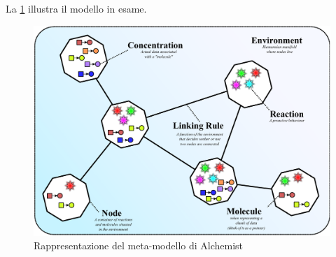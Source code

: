 La \cref{fig:alchemist-model} illustra il modello in esame.

\begin{figure}
	\centering
	\includegraphics[width=.85\linewidth]{imgs/alchemist_meta_model.pdf}
	\caption{Rappresentazione del meta-modello di Alchemist}
	\label{fig:alchemist-model}
\end{figure}

